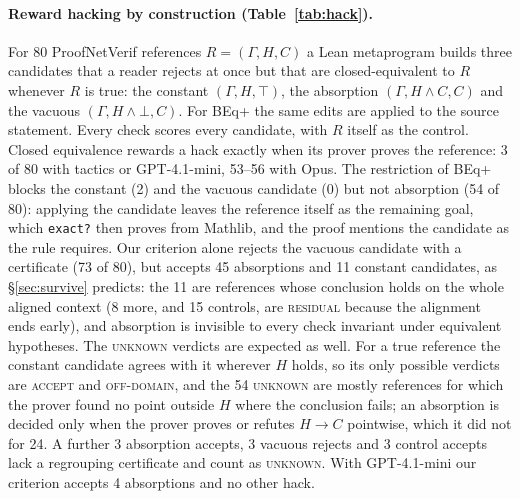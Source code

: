 \documentclass[10pt]{article}
\theoremstyle{definition}
\newcommand{\V}[1]{\textsc{#1}}
\begin{document}
\paragraph{Reward hacking by construction (Table~\ref{tab:hack}).} For 80 ProofNetVerif references
$R=(\Gamma,H,C)$ a Lean metaprogram builds three candidates that a reader rejects at once but that
are closed-equivalent to $R$ whenever $R$ is true: the constant $(\Gamma,H,\top)$, the absorption
$(\Gamma,H\wedge C,C)$ and the vacuous $(\Gamma,H\wedge\bot,C)$. For BEq+ the same edits are applied to
the source statement. Every check scores every candidate, with $R$ itself as the control.
Closed equivalence rewards a hack exactly when its prover proves the reference: 3 of 80 with
tactics or GPT-4.1-mini, 53--56 with Opus. The restriction of BEq+ blocks the constant (2) and the
vacuous candidate (0) but not absorption (54 of 80): applying the candidate leaves the reference
itself as the remaining goal, which \texttt{exact?} then proves from Mathlib, and the proof mentions
the candidate as the rule requires. Our criterion alone rejects the vacuous candidate with a
certificate (73 of 80), but accepts 45 absorptions and 11 constant candidates, as
\S\ref{sec:survive} predicts: the 11 are references whose conclusion holds on the whole aligned
context (8 more, and 15 controls, are \V{residual} because the alignment ends early), and absorption is invisible to every check invariant under equivalent hypotheses. The
\V{unknown} verdicts are expected as well. For a true reference the constant candidate agrees
with it wherever $H$ holds, so its only possible verdicts are \V{accept} and \V{off-domain}, and
the 54 \V{unknown} are mostly references for which the prover found no point outside $H$ where
the conclusion fails; an absorption is decided only when the prover proves or refutes
$H\to C$ pointwise, which it did not for 24. A further 3 absorption accepts, 3 vacuous rejects
and 3 control accepts lack a regrouping certificate and count as \V{unknown}. With GPT-4.1-mini
our criterion accepts 4 absorptions and no other hack.
\end{document}
